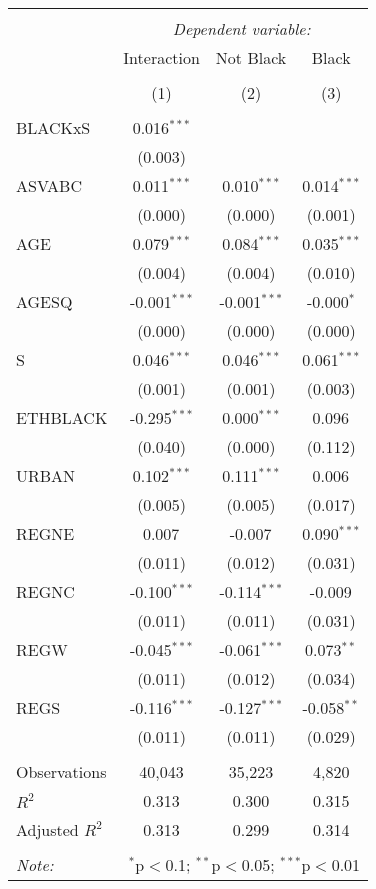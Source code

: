 \begin{table}[!htbp] \centering
\begin{tabular}{@{\extracolsep{5pt}}lccc}
\\[-1.8ex]\hline
\hline \\[-1.8ex]
& \multicolumn{3}{c}{\textit{Dependent variable:}} \
\cr \cline{3-4}
\\[-1.8ex] & \multicolumn{1}{c}{Interaction} & \multicolumn{1}{c}{Not Black} & \multicolumn{1}{c}{Black}  \\
\\[-1.8ex] & (1) & (2) & (3) \\
\hline \\[-1.8ex]
 BLACKxS & 0.016$^{***}$ & & \\
  & (0.003) & & \\
 ASVABC & 0.011$^{***}$ & 0.010$^{***}$ & 0.014$^{***}$ \\
  & (0.000) & (0.000) & (0.001) \\
 AGE & 0.079$^{***}$ & 0.084$^{***}$ & 0.035$^{***}$ \\
  & (0.004) & (0.004) & (0.010) \\
 AGESQ & -0.001$^{***}$ & -0.001$^{***}$ & -0.000$^{*}$ \\
  & (0.000) & (0.000) & (0.000) \\
 S & 0.046$^{***}$ & 0.046$^{***}$ & 0.061$^{***}$ \\
  & (0.001) & (0.001) & (0.003) \\
 ETHBLACK & -0.295$^{***}$ & 0.000$^{***}$ & 0.096$^{}$ \\
  & (0.040) & (0.000) & (0.112) \\
 URBAN & 0.102$^{***}$ & 0.111$^{***}$ & 0.006$^{}$ \\
  & (0.005) & (0.005) & (0.017) \\
 REGNE & 0.007$^{}$ & -0.007$^{}$ & 0.090$^{***}$ \\
  & (0.011) & (0.012) & (0.031) \\
 REGNC & -0.100$^{***}$ & -0.114$^{***}$ & -0.009$^{}$ \\
  & (0.011) & (0.011) & (0.031) \\
 REGW & -0.045$^{***}$ & -0.061$^{***}$ & 0.073$^{**}$ \\
  & (0.011) & (0.012) & (0.034) \\
 REGS & -0.116$^{***}$ & -0.127$^{***}$ & -0.058$^{**}$ \\
  & (0.011) & (0.011) & (0.029) \\
\hline \\[-1.8ex]
 Observations & 40,043 & 35,223 & 4,820 \\
 $R^2$ & 0.313 & 0.300 & 0.315 \\
 Adjusted $R^2$ & 0.313 & 0.299 & 0.314 \\
\hline
\hline \\[-1.8ex]
\textit{Note:} & \multicolumn{3}{r}{$^{*}$p$<$0.1; $^{**}$p$<$0.05; $^{***}$p$<$0.01} \\
\end{tabular}
\end{table}